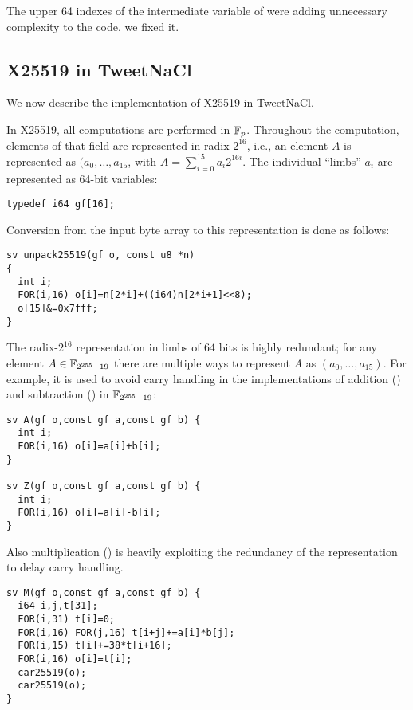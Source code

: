 The upper 64 indexes of the  intermediate variable of
 were adding unnecessary complexity to the code,
we fixed it.

\subsection{X25519 in TweetNaCl}
\label{preliminaries:B}

We now describe the implementation of X25519 in TweetNaCl.

In X25519, all computations are performed in $\mathbb{F}_{p}$.
Throughout the computation, elements of that field
are represented in radix $2^{16}$,
i.e., an element $A$ is represented as $(a_0,\dots,a_{15}$,
with $A = \sum_{i=0}^{15}a_i2^{16i}$.
The individual ``limbs'' $a_i$ are represented as
64-bit  variables:
\begin{lstlisting}[language=Ctweetnacl]
typedef i64 gf[16];
\end{lstlisting}

Conversion from the input byte array to this representation is done
as follows:
\begin{lstlisting}[language=Ctweetnacl]
sv unpack25519(gf o, const u8 *n)
{
  int i;
  FOR(i,16) o[i]=n[2*i]+((i64)n[2*i+1]<<8);
  o[15]&=0x7fff;
}
\end{lstlisting}

The radix-$2^{16}$ representation in limbs of $64$ bits is
highly redundant; for any element $A \in \mathbb{F}_{2^{255}-19}$ there are
multiple ways to represent $A$ as $(a_0,\dots,a_{15})$.
For example, it is used to avoid carry handling in
the implementations of addition ()
and subtraction () in $\mathbb{F}_{2^{255}-19}$:
\begin{lstlisting}[language=Ctweetnacl]
sv A(gf o,const gf a,const gf b) {
  int i;
  FOR(i,16) o[i]=a[i]+b[i];
}

sv Z(gf o,const gf a,const gf b) {
  int i;
  FOR(i,16) o[i]=a[i]-b[i];
}
\end{lstlisting}

Also multiplication () is heavily exploiting the redundancy
of the representation to delay carry handling.
\begin{lstlisting}[language=Ctweetnacl]
sv M(gf o,const gf a,const gf b) {
  i64 i,j,t[31];
  FOR(i,31) t[i]=0;
  FOR(i,16) FOR(j,16) t[i+j]+=a[i]*b[j];
  FOR(i,15) t[i]+=38*t[i+16];
  FOR(i,16) o[i]=t[i];
  car25519(o);
  car25519(o);
}
\end{lstlisting}

